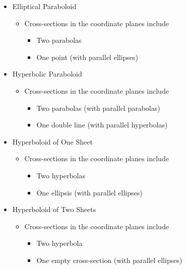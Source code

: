 \begin{itemize}
\item Elliptical Paraboloid
  \begin{itemize}
  \item Cross-sections in the coordinate planes include
    \begin{itemize}
    \item Two parabolas
    \item One point (with parallel ellipses)
    \end{itemize}
  \end{itemize}
\newpage
\item Hyperbolic Paraboloid
  \begin{itemize}
  \item Cross-sections in the coordinate planes include
    \begin{itemize}
    \item Two parabolas (with parallel parabolas)
    \item One double line (with parallel hyperbolas)
    \end{itemize}
  \end{itemize}

\item Hyperboloid of One Sheet
  \begin{itemize}
  \item Cross-sections in the coordinate planes include
    \begin{itemize}
    \item Two hyperbolas
    \item One ellipsis (with parallel ellipses)
    \end{itemize}
  \end{itemize}

\item Hyperboloid of Two Sheets
  \begin{itemize}
  \item Cross-sections in the coordinate planes include
    \begin{itemize}
    \item Two hyperbola
    \item One empty cross-section (with parallel ellipses)
    \end{itemize}
  \end{itemize}

\end{itemize}

